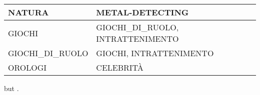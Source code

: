 \documentclass[11pt]{article}
\begin{document}
\begin{table*}
\begin{tabular}{lll}
  NATURA                   & METAL-DETECTING                                                                                                                                       \\ \hline
  GIOCHI                   & GIOCHI\_DI\_RUOLO, INTRATTENIMENTO                                                                                                                    \\ \hline
  GIOCHI\_DI\_RUOLO        & GIOCHI, INTRATTENIMENTO                                                                                                                               \\ \hline
  OROLOGI                  & CELEBRITÀ                                                                                                                                             \\ \hline
  \end{tabular}
  \caption{Example commands for accented characters, to be used in, \emph{e.g.}, Bib\TeX{} entries.}
\end{table*}
 but .
\end{document}
